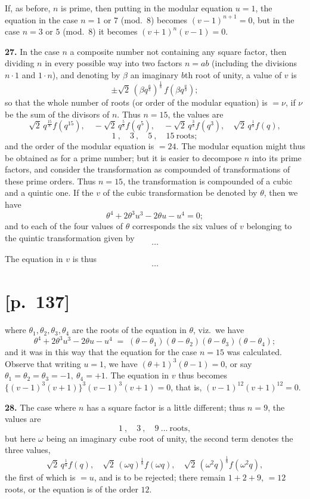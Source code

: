 \documentclass[11pt]{article}
\begin{document}
If, as before, $n$ is prime, then putting in the modular equation $u=1$,
the equation in the case $n=1$ or $7$ (mod.\ 8) becomes $(v - 1)^{n+1} = 0$,
but in the case $n=3$ or $5$ (mod.\ 8) it becomes $(v + 1)^n (v - 1) = 0$.

\medskip
\textbf{27.} In the case $n$ a composite number not containing any square
factor, then dividing $n$ in every possible way into two factors $n = a b$
(including the divisions $n\cdot 1$ and $1\cdot n$), and denoting by
$\beta$ an imaginary $b$th root of unity, a value of $v$ is
\[
\pm \sqrt{2}\,(\beta q^{\frac{a}{b}})^{\!\frac{1}{8}}\, f\!\left(\beta q^{\frac{a}{b}}\right);
\]
so that the whole number of roots (or order of the modular equation) is
$=\nu$, if $\nu$ be the sum of the divisors of $n$. Thus $n=15$, the values
are
\[
\sqrt{2}\,q^{\frac{15}{8}}f(q^{15}),\quad
-\sqrt{2}\,q^{\frac{5}{8}}f(q^{5}),\quad
-\sqrt{2}\,q^{\frac{3}{8}}f(q^3),\quad
\sqrt{2}\,q^{\frac{1}{8}}f(q),
\]
\[
1\ ,\quad 3\ ,\quad 5\ ,\quad 15\ \text{roots};
\]
and the order of the modular equation is $=24$. The modular equation
might thus be obtained as for a prime number; but it is easier to
decompose $n$ into its prime factors, and consider the transformation as
compounded of transformations of these prime orders. Thus $n = 15$, the
transformation is compounded of a cubic and a quintic one. If the $v$ of
the cubic transformation be denoted by $\theta$, then we have
\[
\theta^4 + 2\theta^3 u^3 - 2\theta u - u^4 = 0;
\]
and to each of the four values of $\theta$ corresponds the six values of $v$
belonging to the quintic transformation given by
\[
\ldots
\]

The equation in $v$ is thus
\[
\ldots
\]

\section*{[p.~137]}

where $\theta_1, \theta_2, \theta_3, \theta_4$ are the roots of the equation in $\theta$, viz.\ we have
\[
\theta^4 + 2\theta^3 u^3 - 2\theta u - u^4 \;=\; (\theta - \theta_1)(\theta - \theta_2)(\theta - \theta_3)(\theta - \theta_4);
\]
and it was in this way that the equation for the case $n=15$ was calculated.
Observe that writing $u=1$, we have $(\theta + 1)^3 (\theta - 1) = 0$, or say
$\theta_1 = \theta_2 = \theta_3 = -1,\ \theta_4 = +1$. The equation in $v$
thus becomes $\{(v - 1)^3(v + 1)\}^3 (v - 1)^3(v + 1) = 0$, that is,
$(v - 1)^{12}(v + 1)^{12} = 0$.

\medskip
\textbf{28.} The case where $n$ has a square factor is a little different;
thus $n=9$, the values are
\[
1\ ,\quad 3\ ,\quad 9\ \ldots\ \text{roots},
\]
but here $\omega$ being an imaginary cube root of unity, the second term
denotes the three values,
\[
\sqrt{2}\,q^{\frac{1}{8}}f(q),\quad
\sqrt{2}\,(\omega q)^{\frac{1}{8}}f(\omega q),\quad
\sqrt{2}\,(\omega^2 q)^{\frac{1}{8}}f(\omega^2 q),
\]
the first of which is $=u$, and is to be rejected; there remain $1+2+9$,
$=12$ roots, or the equation is of the order $12$.
\end{document}
